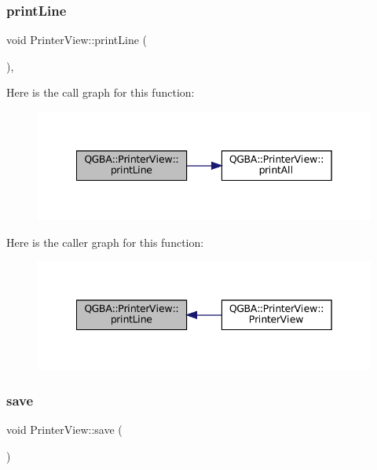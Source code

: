 \subsubsection{\texorpdfstring{print\+Line}{printLine}}
{\footnotesize\ttfamily void Printer\+View\+::print\+Line (\begin{DoxyParamCaption}{ }\end{DoxyParamCaption})\hspace{0.3cm}{\ttfamily [private]}, {\ttfamily [slot]}}

Here is the call graph for this function\+:
\nopagebreak
\begin{figure}[H]
\begin{center}
\leavevmode
\includegraphics[width=342pt]{class_q_g_b_a_1_1_printer_view_a30a8310a3788be585bc9d0dc20a2ea09_cgraph}
\end{center}
\end{figure}
Here is the caller graph for this function\+:
\nopagebreak
\begin{figure}[H]
\begin{center}
\leavevmode
\includegraphics[width=342pt]{class_q_g_b_a_1_1_printer_view_a30a8310a3788be585bc9d0dc20a2ea09_icgraph}
\end{center}
\end{figure}
\mbox{\label{class_q_g_b_a_1_1_printer_view_ae8e7d2e4df544c0f17b3fb34036038f7}} 
\subsubsection{\texorpdfstring{save}{save}}
{\footnotesize\ttfamily void Printer\+View\+::save (\begin{DoxyParamCaption}{ }\end{DoxyParamCaption})\hspace{0.3cm}{\ttfamily [slot]}}

